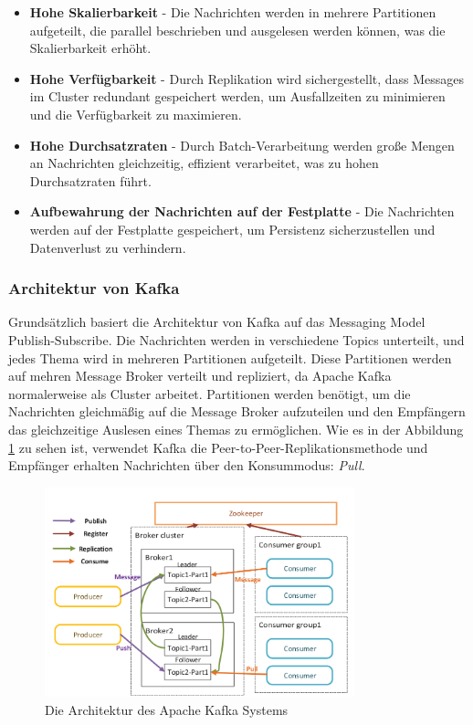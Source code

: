 \begin{itemize}
	\item \textbf{Hohe Skalierbarkeit} - Die Nachrichten werden in mehrere Partitionen aufgeteilt, die parallel beschrieben und ausgelesen werden können, was die Skalierbarkeit erhöht.
	\item \textbf{Hohe Verfügbarkeit} - Durch Replikation wird sichergestellt, dass Messages im Cluster redundant gespeichert werden, um Ausfallzeiten zu minimieren und die Verfügbarkeit zu maximieren.
	\item \textbf{Hohe Durchsatzraten} - Durch Batch-Verarbeitung werden große Mengen an Nachrichten gleichzeitig, effizient verarbeitet, was zu hohen Durchsatzraten führt.
	\item \textbf{Aufbewahrung der Nachrichten auf der Festplatte} - Die Nachrichten werden auf der Festplatte gespeichert, um Persistenz sicherzustellen und Datenverlust zu verhindern.
\end{itemize}

\subsubsection{Architektur von Kafka}

Grundsätzlich basiert die Architektur von Kafka auf das Messaging Model Publish-Subscribe. Die Nachrichten werden in verschiedene Topics unterteilt, und jedes Thema wird in mehreren Partitionen aufgeteilt. Diese Partitionen werden auf mehren Message Broker verteilt und repliziert, da Apache Kafka normalerweise als Cluster arbeitet. Partitionen werden benötigt, um die Nachrichten gleichmäßig auf die Message Broker aufzuteilen und den Empfängern das gleichzeitige Auslesen eines Themas zu ermöglichen. Wie es in der Abbildung \ref{fig:kafkaArchFairComparisonMessagingServices} zu sehen ist, verwendet Kafka die Peer-to-Peer-Replikationsmethode und Empfänger erhalten Nachrichten über den Konsummodus: \emph{Pull}. \cite{narkhedeKafkaDefinitiveGuide2017}

\begin{figure}
    \centering
    \includegraphics[width=0.8\textwidth]{content/img/Research/Message_Services/kafkaArchFairComparisonMessagingServices.png}
    \caption{Die Architektur des Apache Kafka Systems \cite{fuFairComparisonMessage2021}}
    \label{fig:kafkaArchFairComparisonMessagingServices}
\end{figure}
\FloatBarrier

